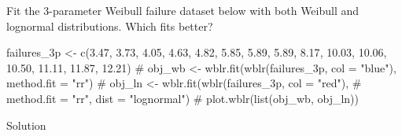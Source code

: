 \documentclass[
  letterpaper,
  DIV=11,
  numbers=noendperiod]{scrreprt}
\newenvironment{Shaded}{\begin{snugshade}}{\end{snugshade}}
\newcommand{\CommentTok}[1]{\textcolor[rgb]{0.37,0.37,0.37}{#1}}
\newcommand{\FloatTok}[1]{\textcolor[rgb]{0.68,0.00,0.00}{#1}}
\newcommand{\FunctionTok}[1]{\textcolor[rgb]{0.28,0.35,0.67}{#1}}
\newcommand{\NormalTok}[1]{\textcolor[rgb]{0.00,0.23,0.31}{#1}}
\newcommand{\OtherTok}[1]{\textcolor[rgb]{0.00,0.23,0.31}{#1}}
\begin{document}
\begin{tcolorbox}[enhanced jigsaw, arc=.35mm, bottomrule=.15mm, bottomtitle=1mm, breakable, colback=white, colbacktitle=quarto-callout-note-color!10!white, colframe=quarto-callout-note-color-frame, coltitle=black, left=2mm, leftrule=.75mm, opacityback=0, opacitybacktitle=0.6, rightrule=.15mm, title=\textcolor{quarto-callout-note-color}{\faInfo}\hspace{0.5em}{Try It}, titlerule=0mm, toprule=.15mm, toptitle=1mm]

Fit the 3-parameter Weibull failure dataset below with both Weibull and
lognormal distributions. Which fits better?

\begin{Shaded}
\begin{Highlighting}[]
\NormalTok{failures\_3p }\OtherTok{\textless{}{-}} \FunctionTok{c}\NormalTok{(}\FloatTok{3.47}\NormalTok{, }\FloatTok{3.73}\NormalTok{, }\FloatTok{4.05}\NormalTok{, }\FloatTok{4.63}\NormalTok{, }\FloatTok{4.82}\NormalTok{, }\FloatTok{5.85}\NormalTok{, }\FloatTok{5.89}\NormalTok{, }\FloatTok{5.89}\NormalTok{,}
                 \FloatTok{8.17}\NormalTok{, }\FloatTok{10.03}\NormalTok{, }\FloatTok{10.06}\NormalTok{, }\FloatTok{10.50}\NormalTok{, }\FloatTok{11.11}\NormalTok{, }\FloatTok{11.87}\NormalTok{, }\FloatTok{12.21}\NormalTok{)}
\CommentTok{\# obj\_wb \textless{}{-} wblr.fit(wblr(failures\_3p, col = "blue"), method.fit = "rr")}
\CommentTok{\# obj\_ln \textless{}{-} wblr.fit(wblr(failures\_3p, col = "red"),}
\CommentTok{\#                    method.fit = "rr", dist = "lognormal")}
\CommentTok{\# plot.wblr(list(obj\_wb, obj\_ln))}
\end{Highlighting}
\end{Shaded}

Solution


\end{tcolorbox}
\end{document}
